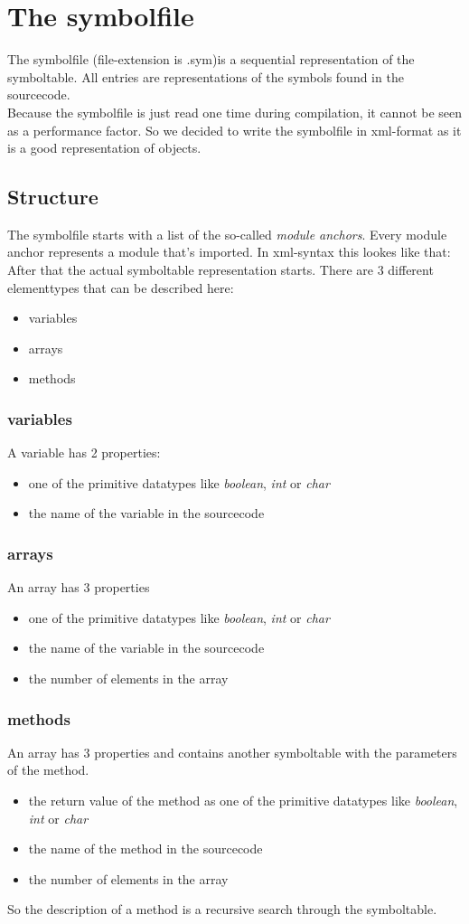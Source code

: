 \section{The symbolfile}
The symbolfile (file-extension is .sym)is a sequential representation of the
symboltable. All entries
are representations of the symbols found in the sourcecode. \\
Because the symbolfile is just read one time during compilation, it cannot be
seen as a performance factor. So we decided to write the symbolfile in
xml-format as it is a good representation of objects. 
\subsection{Structure}
The symbolfile starts with a list of the so-called \emph{module anchors}. Every
module anchor represents a module that's imported. In xml-syntax this lookes
like that: \\
After that the actual symboltable representation starts. There are 3 different
elementtypes that can be described here:
\begin{itemize}
  \item variables
  \item arrays
  \item methods 
\end{itemize}
\subsubsection{variables}
A variable has 2 properties: 
\begin{itemize}
  \item one of the primitive datatypes like \emph{boolean}, \emph{int} or \emph{char}
  \item the name of the variable in the sourcecode
\end{itemize}
\subsubsection{arrays}
An array has 3 properties
\begin{itemize}
  \item one of the primitive datatypes like \emph{boolean}, \emph{int} or \emph{char}
  \item the name of the variable in the sourcecode
  \item the number of elements in the array
\end{itemize}
\subsubsection{methods}
An array has 3 properties and contains another symboltable with the parameters
of the method. 
\begin{itemize}
  \item the return value of the method as one of the primitive datatypes
  like \emph{boolean}, \emph{int} or \emph{char}
  \item the name of the method in the sourcecode
  \item the number of elements in the array
\end{itemize}
So the description of a method is a recursive search through the symboltable.